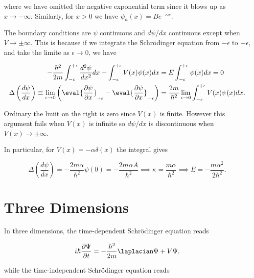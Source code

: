 \documentclass[a4paper,12pt]{report}
\begin{document}
where we have omitted the negative exponential term since it blows up as \(x \to -\infty\). Similarly, for \(x > 0\) we have \(\psi _{\kappa }(x) = Be^{-\kappa x}  \).   

The boundary conditions are \(\psi \) continuous and \(d \psi /dx\) continuous except when \(V \to \pm \infty\). This is because if we integrate the Schrödinger equation from \(- \epsilon \) to \(+ \epsilon \), and take the limite as \(\epsilon \to 0\), we have

\begin{equation}
  \begin{aligned} 
  -\frac{\hbar ^2}{2m} \int_{-\epsilon }^{+\epsilon } \frac{d^2\psi }{dx^2} dx + \int_{-\epsilon }^{+\epsilon } V(x)\psi (x) dx &= E \int_{-\epsilon }^{+\epsilon } \psi (x)dx = 0 \\
  \Delta \left( \frac{d\psi }{dx}  \right) \equiv  \lim_{\epsilon  \to 0} \left( \eval{\frac{\partial \psi }{\partial x} }_{+\epsilon }^{} - \eval{\frac{\partial \psi }{\partial x} }_{-\epsilon }^{}   \right) &= \frac{2m}{\hbar ^2} \lim_{\epsilon  \to 0}  \int_{-\epsilon }^{+\epsilon } V(x)\psi (x)dx.  
  \end{aligned} 
\end{equation}

Ordinary the lmiit on the right is zero since \(V(x)\) is finite. However this argument fails when \(V(x)\) is infinite so \(d\psi /dx\) is discontinuous when \(V(x) \to \pm \infty\).    

In particular, for \(V(x) = - \alpha \delta (x)\) the integral gives 

\begin{equation}
  \Delta \left( \frac{d\psi }{dx}  \right) = -\frac{2m\alpha  }{\hbar ^2} \psi (0)  = -\frac{2m\alpha A}{\hbar ^2} \implies \kappa = \frac{m\alpha }{\hbar ^2} \implies E = -\frac{m\alpha ^2}{2\hbar ^2}.   
\end{equation}

\chapter{Three Dimensions}

In three dimensions, the time-dependent Schrödinger equation reads

\begin{equation}
  i \hbar \frac{\partial \Psi }{\partial t} = -\frac{\hbar ^2}{2m} \laplacian \Psi +V\Psi ,
\end{equation}

while the time-independent Schrödinger equation reads
\end{document}
